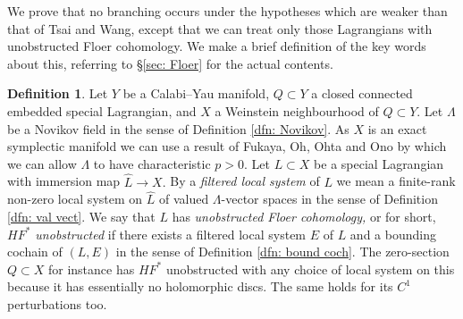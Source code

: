 \documentclass{article}
\theoremstyle{plain}%
\theoremstyle{definition}
\newtheorem{dfn}[thm]{Definition}
\numberwithin{equation}{section}
\numberwithin{figure}{section}
\def\l{\label}
\def\La{\Lambda}
\begin{document}
We prove that no branching occurs under the hypotheses which are weaker than that of Tsai and Wang, except that we can treat only those Lagrangians with unobstructed Floer cohomology. We make a brief definition of the key words about this, referring to \S\ref{sec: Floer} for the actual contents.
\begin{dfn}\l{dfn: HF}
Let $Y$ be a Calabi--Yau manifold, $Q\subset Y$ a closed connected embedded special Lagrangian, and $X$ a Weinstein neighbourhood of $Q\subset Y.$ Let $\La$ be a Novikov field in the sense of Definition \ref{dfn: Novikov}. As $X$ is an exact symplectic manifold we can use a result of Fukaya, Oh, Ohta and Ono \cite{FOOO-Z} by which we can allow $\La$ to have characteristic $p>0.$ Let $L\subset X$ be a special Lagrangian with immersion map $\hat L\to X.$ By a {\it filtered local system} of $L$ we mean a finite-rank non-zero local system on $\hat L$ of valued $\La$-vector spaces in the sense of Definition \ref{dfn: val vect}. We say that $L$ has {\it unobstructed Floer cohomology,} or for short, {\it $HF^*$ unobstructed} if there exists a filtered local system $E$ of $L$ and a bounding cochain of $(L,E)$ in the sense of Definition \ref{dfn: bound coch}. The zero-section $Q\subset X$ for instance has $HF^*$ unobstructed with any choice of local system on this because it has essentially no holomorphic discs. The same holds for its $C^1$ perturbations too. 
\end{dfn}
\end{document}
